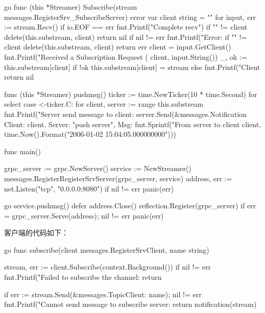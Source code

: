 \begin{outline}[enumerate]
\begin{code-block}{go}
func (this *Streamer) Subscribe(stream messages.RegisterSrv_SubscribeServer) error {
    var client string = ""
    for {
        input, err := stream.Recv()
        if io.EOF == err {
            fmt.Printf("Complete recv\n")
            if "" != client {
                delete(this.substream, client)
            }
            return nil
        }
        if nil != err {
            fmt.Printf("Error: %
            if "" != client {
                delete(this.substream, client)
            }
            return err
        }
        client = input.GetClient()
        fmt.Printf("Received a Subscription Request (%
            client, input.String())
        _, ok := this.substream[client]
        if !ok {
            this.substream[client] = stream
        } else {
            fmt.Printf("Client %
        }
    }
    return nil
}

func (this *Streamer) pushmsg() {
    ticker := time.NewTicker(10 * time.Second)
    for {
        select {
        case <-ticker.C:
            for client, server := range this.substream {
                fmt.Printf("Server send message to client:%
                    server.Send(&messages.Notification{
                        Client: client, Server: "push server",
                        Msg: fmt.Sprintf("From server to client %
                    client, time.Now().Format("2006-01-02 15:04:05.000000000"))})
            }
        }
    }
}

func main() {
    grpc_server := grpc.NewServer()
    service := NewStreamer()
    messages.RegisterRegisterSrvServer(grpc_server, service)
    address, err := net.Listen("tcp", "0.0.0.0:8080")
    if nil != err {
        panic(err)
    }

    go service.pushmsg()
    defer address.Close()
    reflection.Register(grpc_server)
    if err = grpc_server.Serve(address); nil != err {
        panic(err)
    }
}
\end{code-block}

  客户端的代码如下：
\begin{code-block}{go}
func subscribe(client messages.RegisterSrvClient, name string) {
    stream, err := client.Subscribe(context.Background())
    if nil != err {
        fmt.Printf("Failed to subscribe the channel:%
        return
    }

    if err := stream.Send(&messages.Topic{Client: name}); nil != err {
        fmt.Printf("Cannot send message to subscribe server:%
        return
    }
    notification(stream)
}


\end{code-block}
\end{outline}
